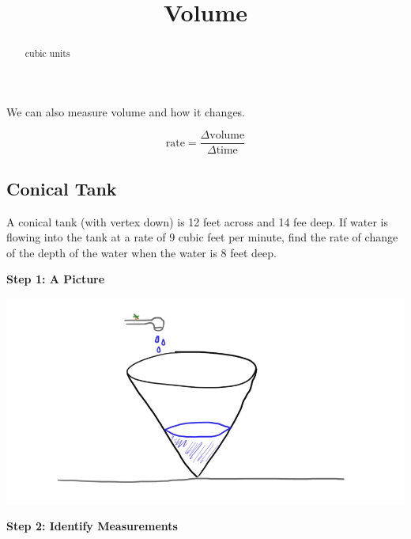 \documentclass{ximera}
\title{Volume}
\begin{document}
\begin{abstract}
cubic units
\end{abstract}
\maketitle



We can also measure volume and how it changes.



\[
\text{rate} = \frac{\Delta \text{volume}}{\Delta \text{time}} 
\]








\subsection{Conical Tank}

A conical tank (with vertex down) is 12 feet across and 14 fee deep. If water is flowing into the tank at a rate of 9 cubic feet per minute, find the rate of change of the depth of the water when the water is 8 feet deep.






\textbf{\textcolor{purple!85!blue}{Step 1: A Picture}}


\begin{image}
\includegraphics{pics/cone_1.png}
\end{image}




\textbf{\textcolor{purple!85!blue}{Step 2: Identify Measurements}}
\end{document}
